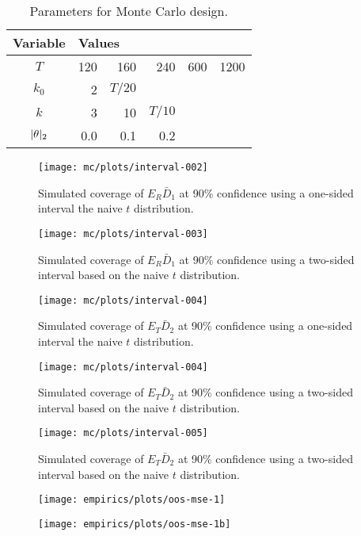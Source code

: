 \documentclass[11pt]{article}
\begin{document}
\begin{table}
  \centering
  \begin{tabular}{c|r|r|r|r|r}
  Variable & \multicolumn{5}{l}{Values}
  \\\hline
  $T$   & 120 & 160 & 240 & 600 & 1200 \\
  $k_0$ &   2 & \multicolumn{1}{c}{$T/20$} \\
  $k$   &   3 &  10 & \multicolumn{1}{c}{$T/10$} \\
  $\lvert \theta \rvert_2$ & 0.0 & 0.1 & 0.2
  \end{tabular}
  \caption{Parameters for Monte Carlo design.}
  \label{tab:mc-parameters}
\end{table}
\clearpage
\begin{figure}
\centering
\texttt{[image: mc/plots/interval-002]}
\caption{Simulated coverage of $E_R \bar D_1$ at 90\% confidence using
a one-sided interval the naive \oos $t$ distribution.}
\end{figure}
\clearpage
\begin{figure}
\centering
\texttt{[image: mc/plots/interval-003]}
\caption{Simulated coverage of $E_R \bar D_1$ at 90\% confidence using
a two-sided interval based on the naive \oos $t$ distribution.}
\end{figure}
\clearpage
\begin{figure}
\centering
\texttt{[image: mc/plots/interval-004]}
\caption{Simulated coverage of $E_T \bar D_2$ at 90\% confidence using
a one-sided interval the naive \oos $t$ distribution.}
\end{figure}
\clearpage
\begin{figure}
\centering
\texttt{[image: mc/plots/interval-004]}
\caption{Simulated coverage of $E_T \bar D_2$ at 90\% confidence using
a two-sided interval based on the naive \oos $t$ distribution.}
\end{figure}
\clearpage
\begin{figure}
\centering
\texttt{[image: mc/plots/interval-005]}
\caption{Simulated coverage of $E_T \bar D_2$ at 90\% confidence using
a two-sided interval based on the naive \oos $t$ distribution.}
\end{figure}
\clearpage

\begin{figure}
\centering
\texttt{[image: empirics/plots/oos-mse-1]}
\label{fig:oosmseI}
\end{figure}

\begin{figure}
\centering
\texttt{[image: empirics/plots/oos-mse-1b]}
\label{fig:oosmseII}
\end{figure}
\end{document}
